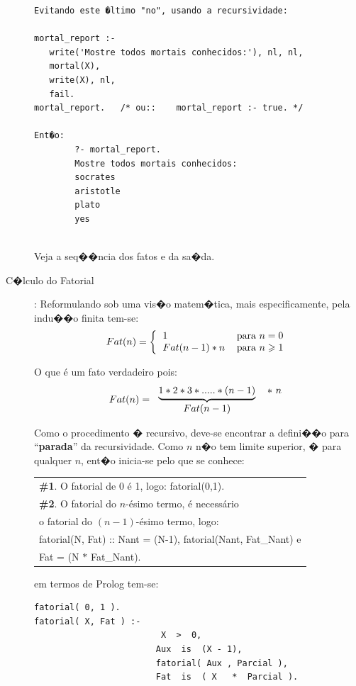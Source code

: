 \documentclass[final,a4paper]{article}
\begin{document}
\begin{description}
\begin{lstlisting}
Evitando este �ltimo "no", usando a recursividade:

mortal_report :-
   write('Mostre todos mortais conhecidos:'), nl, nl,
   mortal(X),
   write(X), nl,
   fail.
mortal_report.   /* ou::    mortal_report :- true. */

Ent�o:
        ?- mortal_report.
        Mostre todos mortais conhecidos:
        socrates
        aristotle
        plato
        yes
        
\end{lstlisting}

Veja a seq��ncia dos fatos e da sa�da.

\newpage
\item [C�lculo do Fatorial]: Reformulando sob uma vis�o
matem�tica, mais especificamente, pela indu��o finita tem-se:
\[
Fat(n)=\left\{
\begin{tabular}[c]{ll}%
$1$ & para $n=0$\\
$Fat(n-1)\ast n$ & para $n\geqslant1$%
\end{tabular}
\right.
\]

\vskip 11pt
O que \'{e} um fato verdadeiro pois:
\vskip 11pt
\[
Fat(n)=
\begin{tabular}
[c]{cc}%
$\underbrace{1\ast2\ast3\ast.....\ast(n-1)}$ & $\ast \ n$\\
$Fat(n-1)$ &
\end{tabular}
\]

Como o procedimento � recursivo, deve-se encontrar a defini��o para
``\textbf{parada}'' da recursividade. Como $n$ n�o tem limite superior, � para qualquer $n$, ent�o inicia-se pelo que se conhece:

\begin{center}%
\begin{tabular}
[c]{|l|}\hline
\textbf{\#1}. O fatorial de 0 \'{e} 1, logo: fatorial(0,1).\\
\textbf{\#2}. O fatorial  do $n$-\'{e}simo termo, \'{e} necess\'{a}rio \\
o fatorial do $(n-1)$-\'{e}simo termo, logo:\\
fatorial(N, Fat) ::  Nant = (N-1), fatorial(Nant, Fat\_Nant) e \\
 Fat = (N $\ast$ Fat\_Nant).\\ \hline
\end{tabular}
\end{center}

em termos de Prolog tem-se:
{\small
\begin{verbatim}
fatorial( 0, 1 ).
fatorial( X, Fat ) :-
                         X  >  0,
                        Aux  is  (X - 1),
                        fatorial( Aux , Parcial ),
                        Fat  is  ( X   *  Parcial ).


\end{verbatim}}
\end{description}
\end{document}
